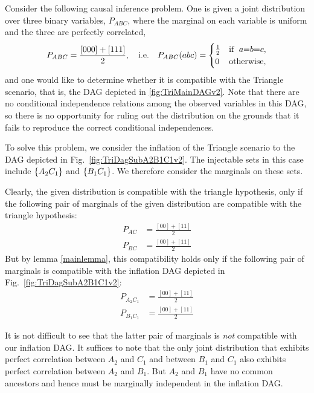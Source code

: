 Consider the following causal inference problem.  One is given a joint distribution over three binary variables, $P_{A B C}$, where the marginal on each variable is uniform and the three are perfectly correlated,
\begin{align}\label{eq:ghzdistribution1}
P_{A B C} =\frac{[000]+[111]}{2},\quad\text{i.e.}\quad P_{A B C}(a b c)=\begin{cases}\tfrac{1}{2}&\text{if }\; a\mathord{=} b\mathord{=} c, \\ 0&\text{otherwise},\end{cases}
\end{align}
and one would like to determine whether it is compatible with the Triangle scenario, that is, the DAG depicted in \cref{fig:TriMainDAGv2}.  Note that there are no conditional independence relations among the observed variables in this DAG, so there is no opportunity for ruling out the distribution on the grounds that it fails to reproduce the correct conditional independences. 


To solve this problem, we consider the inflation of the Triangle scenario to the DAG depicted in Fig.~\ref{fig:TriDagSubA2B1C1v2}.  
The injectable sets in this case include $\left\lbrace A_2 C_1\right\rbrace$ and $\left\lbrace B_1 C_1\right\rbrace$.  We therefore consider the marginals on these sets.

Clearly, the given distribution is compatible with the triangle hypothesis, only if the following pair of marginals of the given distribution are compatible with the triangle hypothesis:
\begin{align}
P_{A C} &= \frac{[00]+[11]}{2}\label{j1}\\
P_{B C} &= \frac{[00]+[11]}{2}\label{j2}
\end{align}
But by lemma \ref{mainlemma}, this compatibility holds only if the following pair of marginals is compatible with the inflation DAG depicted in Fig.~\ref{fig:TriDagSubA2B1C1v2}:
\begin{align}
P_{A_2 C_1} &= \frac{[00]+[11]}{2} \label{k1}\\
P_{B_1 C_1} &= \frac{[00]+[11]}{2} \label{k2}
\end{align}

It is not difficult to see that the latter pair of marginals is \emph{not} compatible with our inflation DAG. It suffices to note that the only joint distribution that exhibits perfect correlation between $A_2$ and $C_1$ and between $B_1$ and $C_1$ also exhibits perfect correlation between $A_2$ and $B_1$.  But $A_2$ and $B_1$ have no common ancestors and hence must be marginally independent in the inflation DAG.

